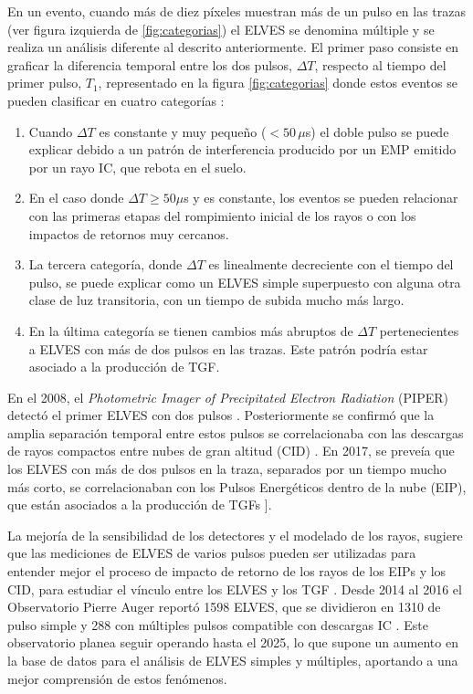 \documentclass[11pt,oneside,openany,letter]{book}
\begin{document}
En un evento, cuando m\'as de diez p\'ixeles muestran m\'as de un pulso en las trazas (ver figura izquierda de \ref{fig:categorias}) el ELVES se denomina m\'ultiple y se realiza un an\'alisis diferente al descrito anteriormente. El primer paso consiste en graficar la diferencia temporal entre los dos pulsos, $\Delta T$, respecto al tiempo del primer pulso, $T_1$, representado en la figura \ref{fig:categorias} donde estos eventos se pueden clasificar en cuatro categor\'ias \cite{Mussa2019}:

\begin{enumerate}
    \item Cuando $\Delta T$ es constante y muy pequeño ($<50 \,\mu$s) el doble pulso se puede explicar debido a un patrón de interferencia producido por un EMP emitido por un rayo IC, que rebota en el suelo. 
    \item En el caso donde $\Delta T \geq 50\mu$s y es constante, los eventos se pueden relacionar con las primeras etapas del rompimiento inicial de los rayos o con los impactos de retornos muy cercanos. 
    \item La tercera categor\'ia, donde $\Delta T$ es linealmente decreciente con el tiempo del pulso, se puede explicar como un ELVES simple superpuesto con alguna otra clase de luz transitoria, con un tiempo de subida mucho más largo.
    \item En la \'ultima categor\'ia se tienen cambios m\'as abruptos de $\Delta T$ pertenecientes a ELVES con m\'as de dos pulsos en las trazas. Este patr\'on podr\'ia estar asociado a la producci\'on de TGF.
    \end{enumerate}

En el 2008, el \textit{Photometric Imager of Precipitated Electron Radiation} (PIPER) detectó el primer ELVES con dos pulsos \cite{Newsome2010}. Posteriormente se confirmó que la amplia separación temporal entre estos pulsos se correlacionaba con las descargas de rayos compactos entre nubes de gran altitud (CID) \cite{Marshall2015,Lyu2015}. En 2017, se preveía que los ELVES con más de dos pulsos en la traza, separados por un tiempo mucho más corto, se correlacionaban con los Pulsos Energéticos dentro de la nube (EIP), que est\'an asociados a la producci\'on de TGFs \cite{Liu2017,neubertEtal2020}]. 

La mejor\'ia de la sensibilidad de los detectores y el modelado de los rayos, sugiere que las mediciones de ELVES de varios pulsos pueden ser utilizadas para entender mejor el proceso de impacto de retorno de los rayos de los EIPs y los CID, para estudiar el vínculo entre los ELVES y los TGF \cite{Marshall2014,Da2015}. Desde 2014 al 2016 el Observatorio Pierre Auger report\'o 1598 ELVES, que se dividieron en 1310 de pulso simple y 288 con m\'ultiples pulsos compatible con descargas IC \cite{aab2020}. Este observatorio planea seguir operando hasta el 2025, lo que supone un aumento en la base de datos para el análisis de ELVES simples y m\'ultiples, aportando a una mejor comprensi\'on de estos fen\'omenos. 



\end{document}

